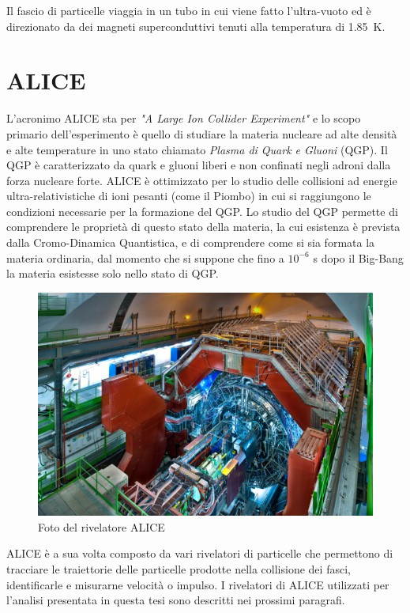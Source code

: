 Il fascio di particelle viaggia in un tubo in cui viene fatto l'ultra-vuoto ed è direzionato da dei magneti superconduttivi tenuti alla temperatura di 1.85~K.

\section{ALICE}

L'acronimo ALICE sta per \textit{"A Large Ion Collider Experiment"} e lo  scopo primario dell'esperimento è quello di studiare la materia nucleare ad alte densità e alte temperature in uno stato chiamato \textit{Plasma di Quark e Gluoni} (QGP). Il QGP è caratterizzato da quark e gluoni liberi e non confinati negli adroni dalla forza nucleare forte. ALICE è ottimizzato per lo studio delle collisioni ad energie ultra-relativistiche di ioni pesanti (come il Piombo) in cui si raggiungono le condizioni necessarie per la formazione del QGP. Lo studio del QGP permette di comprendere le proprietà di questo stato della materia, la cui esistenza è prevista dalla Cromo-Dinamica Quantistica, e di comprendere come si sia formata la materia ordinaria, dal momento che si suppone che fino a $10^{-6}$ s dopo il Big-Bang la materia esistesse solo nello stato di QGP.  
    
    \begin{figure}[htbp]
        \centering
        \includegraphics[width=0.6\linewidth]{ALICE/ALICE_LRsaba_CERN_0212_3219.jpg}
        \caption{Foto del rivelatore ALICE}
        \label{fig:ALICEcomplex}
    \end{figure}
    
ALICE \cite{Collaboration_2008_ALICE} è a sua volta composto da vari rivelatori di particelle che permettono di tracciare le traiettorie delle particelle prodotte nella collisione dei fasci, identificarle e misurarne velocità o impulso. I rivelatori di ALICE utilizzati per l'analisi presentata in questa tesi sono descritti nei prossimi paragrafi.

